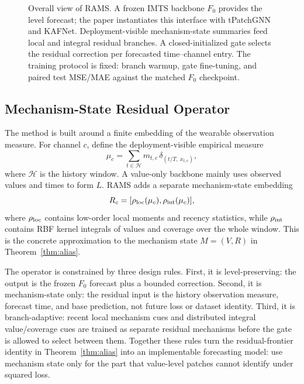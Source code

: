 ﻿\documentclass[10pt,conference]{IEEEtran}
\newcommand{\method}{\textnormal{\mbox{RAMS}}}
\newcommand{\baseT}{\textnormal{\mbox{tPatchGNN}}}
\newcommand{\baseK}{\textnormal{\mbox{KAFNet}}}
\begin{document}
\begin{figure}[t]
{
}
\caption{Overall view of \method.  A frozen IMTS backbone \(F_0\) provides the
level forecast; the paper instantiates this interface with \baseT{} and
\baseK{}.  Deployment-visible mechanism-state summaries feed local and integral
residual branches.  A closed-initialized gate selects the residual correction
per forecasted time--channel entry.  The training protocol is fixed: branch
warmup, gate fine-tuning, and paired test MSE/MAE against the matched \(F_0\)
checkpoint.}
\label{fig:architecture}
\end{figure}

\subsection{Mechanism-State Residual Operator}

The method is built around a finite embedding of the wearable observation
measure.  For channel \(c\), define the deployment-visible empirical measure
\begin{equation}
\mu_c=\sum_{t\in\mathcal{H}} m_{t,c}\,\delta_{(t/T,\ x_{t,c})},
\end{equation}
where \(\mathcal{H}\) is the history window.  A value-only backbone mainly uses
observed values and times to form \(L\).  \method{} adds a separate
mechanism-state embedding
\begin{equation}
R_c=[\rho_{\rm loc}(\mu_c),\rho_{\rm int}(\mu_c)],
\end{equation}
where \(\rho_{\rm loc}\) contains low-order local moments and recency
statistics, while \(\rho_{\rm int}\) contains RBF kernel integrals of values
and coverage over the whole window.  This is the concrete approximation to
the mechanism state \(M=(V,R)\) in Theorem~\ref{thm:alias}.

The operator is constrained by three design rules.  First, it is
level-preserving: the output is the frozen \(F_0\) forecast plus a bounded
correction.  Second, it is mechanism-state only: the residual input is the
history observation measure, forecast time, and base prediction, not future
loss or dataset identity.  Third, it is branch-adaptive: recent local
mechanism cues and distributed integral value/coverage cues are trained as
separate residual mechanisms before the gate is allowed to select between them.
Together these rules turn the residual-frontier identity in
Theorem~\ref{thm:alias} into an implementable forecasting model: use mechanism
state only for the part that value-level patches cannot identify under squared
loss.
\end{document}
